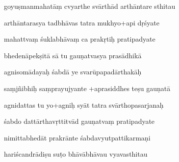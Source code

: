 \documentclass[article,12pt,a4paper]{memoir}%
\newcounter{parCount}
\begin{document}
	  
	  \pstart {} goyuṣmanmahatāṃ cvyarthe svārthād arthāntare sthitau 
	{}
	\pend%
      

	  
	  \pstart \leavevmode%
	arthāntarasya tadbhāvas tatra mukhyo+api dṛśyate 
	{}
	\pend%
      

	  
	  \pstart {} mahattvaṃ śuklabhāvaṃ ca prakṛtiḥ pratipadyate 
	{}
	\pend%
      

	  
	  \pstart \leavevmode%
	bhedenāpekṣitā sā tu gauṇatvasya prasādhikā 
	{}
	\pend%
      

	  
	  \pstart {} agnisomādayaḥ śabdā ye svarūpapadārthakāḥ 
	{}
	\pend%
      

	  
	  \pstart \leavevmode%
	saṃjñibhiḥ saṃprayujyante +aprasiddhes teṣu gauṇatā 
	{}
	\pend%
      

	  
	  \pstart {} agnidattas tu yo+agniḥ syāt tatra svārthopasarjanaḥ 
	{}
	\pend%
      

	  
	  \pstart \leavevmode%
	śabdo dattārthavṛttitvād gauṇatvaṃ pratipadyate 
	{}
	\pend%
      

	  
	  \pstart {} nimittabhedāt prakrānte śabdavyutpattikarmaṇi 
	{}
	\pend%
      

	  
	  \pstart \leavevmode%
	hariścandrādiṣu suṭo bhāvābhāvau vyavasthitau 
	{}
	\pend%
      
\end{document}
